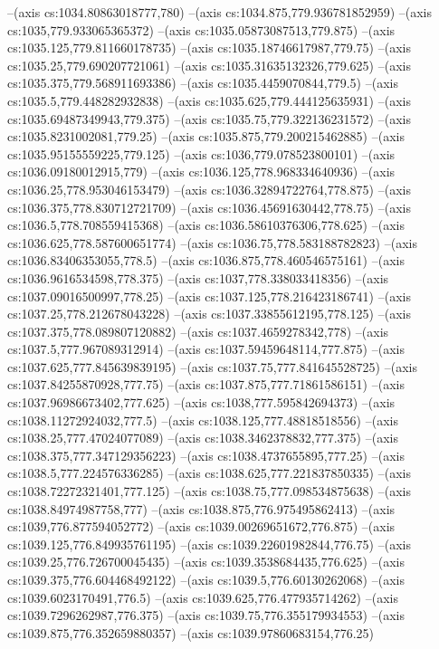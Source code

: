 --(axis cs:1034.80863018777,780)
--(axis cs:1034.875,779.936781852959)
--(axis cs:1035,779.933065365372)
--(axis cs:1035.05873087513,779.875)
--(axis cs:1035.125,779.811660178735)
--(axis cs:1035.18746617987,779.75)
--(axis cs:1035.25,779.690207721061)
--(axis cs:1035.31635132326,779.625)
--(axis cs:1035.375,779.568911693386)
--(axis cs:1035.4459070844,779.5)
--(axis cs:1035.5,779.448282932838)
--(axis cs:1035.625,779.444125635931)
--(axis cs:1035.69487349943,779.375)
--(axis cs:1035.75,779.322136231572)
--(axis cs:1035.8231002081,779.25)
--(axis cs:1035.875,779.200215462885)
--(axis cs:1035.95155559225,779.125)
--(axis cs:1036,779.078523800101)
--(axis cs:1036.09180012915,779)
--(axis cs:1036.125,778.968334640936)
--(axis cs:1036.25,778.953046153479)
--(axis cs:1036.32894722764,778.875)
--(axis cs:1036.375,778.830712721709)
--(axis cs:1036.45691630442,778.75)
--(axis cs:1036.5,778.708559415368)
--(axis cs:1036.58610376306,778.625)
--(axis cs:1036.625,778.587600651774)
--(axis cs:1036.75,778.583188782823)
--(axis cs:1036.83406353055,778.5)
--(axis cs:1036.875,778.460546575161)
--(axis cs:1036.9616534598,778.375)
--(axis cs:1037,778.338033418356)
--(axis cs:1037.09016500997,778.25)
--(axis cs:1037.125,778.216423186741)
--(axis cs:1037.25,778.212678043228)
--(axis cs:1037.33855612195,778.125)
--(axis cs:1037.375,778.089807120882)
--(axis cs:1037.4659278342,778)
--(axis cs:1037.5,777.967089312914)
--(axis cs:1037.59459648114,777.875)
--(axis cs:1037.625,777.845639839195)
--(axis cs:1037.75,777.841645528725)
--(axis cs:1037.84255870928,777.75)
--(axis cs:1037.875,777.71861586151)
--(axis cs:1037.96986673402,777.625)
--(axis cs:1038,777.595842694373)
--(axis cs:1038.11272924032,777.5)
--(axis cs:1038.125,777.48818518556)
--(axis cs:1038.25,777.47024077089)
--(axis cs:1038.3462378832,777.375)
--(axis cs:1038.375,777.347129356223)
--(axis cs:1038.4737655895,777.25)
--(axis cs:1038.5,777.224576336285)
--(axis cs:1038.625,777.221837850335)
--(axis cs:1038.72272321401,777.125)
--(axis cs:1038.75,777.098534875638)
--(axis cs:1038.84974987758,777)
--(axis cs:1038.875,776.975495862413)
--(axis cs:1039,776.877594052772)
--(axis cs:1039.00269651672,776.875)
--(axis cs:1039.125,776.849935761195)
--(axis cs:1039.22601982844,776.75)
--(axis cs:1039.25,776.726700045435)
--(axis cs:1039.3538684435,776.625)
--(axis cs:1039.375,776.604468492122)
--(axis cs:1039.5,776.60130262068)
--(axis cs:1039.6023170491,776.5)
--(axis cs:1039.625,776.477935714262)
--(axis cs:1039.7296262987,776.375)
--(axis cs:1039.75,776.355179934553)
--(axis cs:1039.875,776.352659880357)
--(axis cs:1039.97860683154,776.25)
